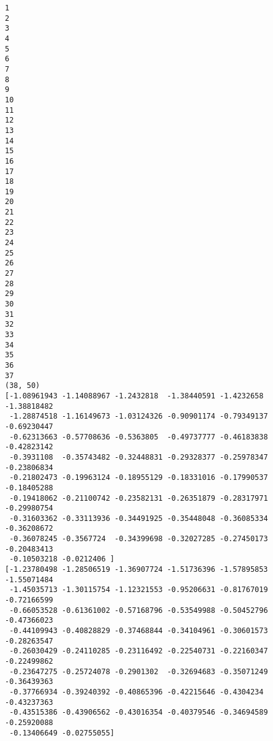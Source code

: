 \documentclass[11pt]{article}
\begin{document}
    \begin{Verbatim}[commandchars=\\\{\}]
1
2
3
4
5
6
7
8
9
10
11
12
13
14
15
16
17
18
19
20
21
22
23
24
25
26
27
28
29
30
31
32
33
34
35
36
37
(38, 50)
[-1.08961943 -1.14088967 -1.2432818  -1.38440591 -1.4232658  -1.38818482
 -1.28874518 -1.16149673 -1.03124326 -0.90901174 -0.79349137 -0.69230447
 -0.62313663 -0.57708636 -0.5363805  -0.49737777 -0.46183838 -0.42823142
 -0.3931108  -0.35743482 -0.32448831 -0.29328377 -0.25978347 -0.23806834
 -0.21802473 -0.19963124 -0.18955129 -0.18331016 -0.17990537 -0.18405288
 -0.19418062 -0.21100742 -0.23582131 -0.26351879 -0.28317971 -0.29980754
 -0.31603362 -0.33113936 -0.34491925 -0.35448048 -0.36085334 -0.36208672
 -0.36078245 -0.3567724  -0.34399698 -0.32027285 -0.27450173 -0.20483413
 -0.10503218 -0.0212406 ]
[-1.23780498 -1.28506519 -1.36907724 -1.51736396 -1.57895853 -1.55071484
 -1.45035713 -1.30115754 -1.12321553 -0.95206631 -0.81767019 -0.72166599
 -0.66053528 -0.61361002 -0.57168796 -0.53549988 -0.50452796 -0.47366023
 -0.44109943 -0.40828829 -0.37468844 -0.34104961 -0.30601573 -0.28263547
 -0.26030429 -0.24110285 -0.23116492 -0.22540731 -0.22160347 -0.22499862
 -0.23647275 -0.25724078 -0.2901302  -0.32694683 -0.35071249 -0.36439363
 -0.37766934 -0.39240392 -0.40865396 -0.42215646 -0.4304234  -0.43237363
 -0.43515386 -0.43906562 -0.43016354 -0.40379546 -0.34694589 -0.25920088
 -0.13406649 -0.02755055]

    \end{Verbatim}
\end{document}

